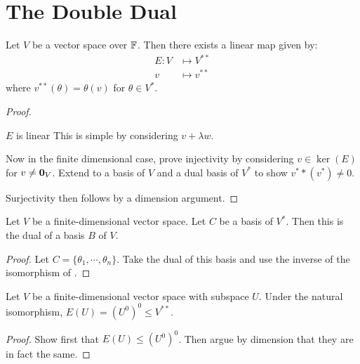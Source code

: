 \documentclass[../Main.tex]{subfiles}
\begin{document}
\section{The Double Dual}
\begin{theorem}
    Let $V$ be a vector space over $\mathbb{F}$. Then there exists a linear map given by:
    \begin{align*}
        E : V &\mapsto V^{**}\\
        v &\mapsto v^{**}
    \end{align*}
    where $v^{**}(\theta) = \theta(v)$ for $\theta \in V^*$.
    \label{thmNaturalIsomorphism}
\end{theorem}
\begin{proof}
    \begin{subproof}{$E$ is linear}
        This is simple by considering $v + \lambda w$.
    \end{subproof}
    Now in the finite dimensional case, prove injectivity by considering $v \in \ker(E)$ for $v \neq \boldsymbol{0}_V$. Extend to a basis of $V$ and a dual basis of $V^*$ to show $v^**(v^*) \neq 0$.

    Surjectivity then follows by a dimension argument.
\end{proof}
\begin{corollary}
    Let $V$ be a finite-dimensional vector space. Let $C$ be a basis of $V^*$. Then this is the dual of a basis $B$ of $V$.
    \label{corDualBasisIsBasis}
\end{corollary}
\begin{proof}
    Let $C = \{\theta_1, \cdots, \theta_n\}$. Take the dual of this basis and use the inverse of the isomorphism of .
\end{proof}
\begin{corollary}
    Let $V$ be a finite-dimensional vector space with subspace $U$. Under the natural isomorphism, $E(U) = (U^0)^0 \leq V^{**}$.
    \label{corDoubleAnnih}
\end{corollary}
\begin{proof}
    Show first that $E(U) \leq (U^0)^0$. Then argue by dimension that they are in fact the same.
\end{proof}
\end{document}
